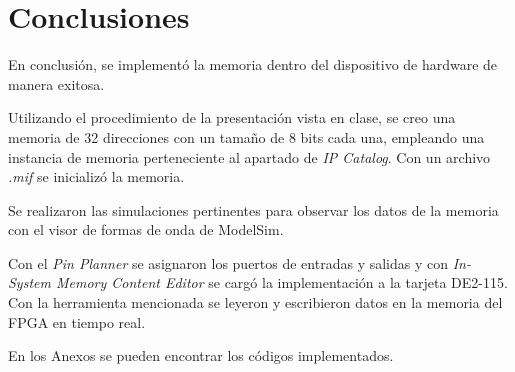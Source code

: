 \section{Conclusiones}
En conclusión, se implementó la memoria dentro del dispositivo de hardware de manera exitosa.

Utilizando el procedimiento de la presentación vista en clase, se creo una memoria de 32 direcciones con un tamaño de 8 bits cada una, empleando una instancia de memoria perteneciente al apartado de \textit{IP Catalog}. Con un archivo \textit{.mif} se inicializó la memoria.

Se realizaron las simulaciones pertinentes para observar los datos de la memoria con el visor de formas de onda de ModelSim.

Con el \textit{Pin Planner} se asignaron los puertos de entradas y salidas y con \textit{In-System Memory Content Editor} se cargó la implementación a la tarjeta DE2-115. Con la herramienta mencionada se leyeron y escribieron datos en la memoria del FPGA en tiempo real.

En los Anexos se pueden encontrar los códigos implementados.